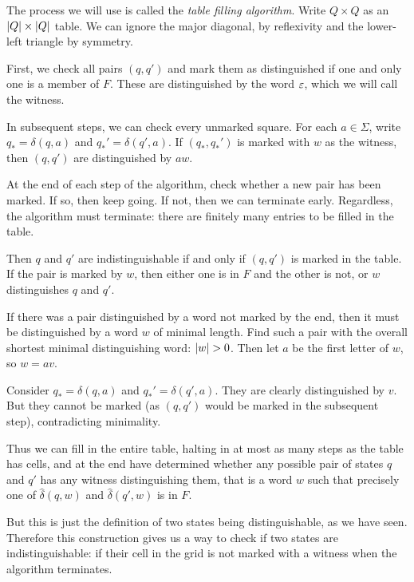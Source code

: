 \documentclass{article}
\begin{document}
\begin{prf}
	The process we will use is called the \textit{table filling algorithm}. Write $Q \times Q$ as an $\left\lvert Q \right\rvert \times \left\lvert Q \right\rvert$ table. We can ignore the major diagonal, by reflexivity and the lower-left triangle by symmetry.
	    
	First, we check all pairs $(q, q')$ and mark them as distinguished if one and only one is a member of $F$. These are distinguished by the word $\varepsilon$, which we will call the witness.
	    
	In subsequent steps, we can check every unmarked square. For each $a \in \Sigma$, write $q_* = \delta(q, a)$ and $q_*' = \delta(q', a)$. If $(q_*, q_*')$ is marked with $w$ as the witness, then $(q, q')$ are distinguished by $aw$.
	    
	At the end of each step of the algorithm, check whether a new pair has been marked. If so, then keep going. If not, then we can terminate early. Regardless, the algorithm must terminate: there are finitely many entries to be filled in the table.
	    
	Then $q$ and $q'$ are indistinguishable if and only if $(q, q')$ is marked in the table. If the pair is marked by $w$, then either one is in $F$ and the other is not, or $w$ distinguishes $q$ and $q'$.
	    
	If there was a pair distinguished by a word not marked by the end, then it must be distinguished by a word $w$ of minimal length. Find such a pair with the overall shortest minimal distinguishing word: $\left\lvert w \right\rvert > 0$. Then let $a$ be the first letter of $w$, so $w = av$.
	    
	Consider $q_* = \delta(q, a)$ and $q_*' = \delta(q', a)$. They are clearly distinguished by $v$. But they cannot be marked (as $(q, q')$ would be marked in the subsequent step), contradicting minimality.
	    
	Thus we can fill in the entire table, halting in at most as many steps as the table has cells, and at the end have determined whether any possible pair of states $q$ and $q'$ has any witness distinguishing them, that is a word $w$ such that precisely one of $\hat \delta(q, w)$ and $\hat \delta(q', w)$ is in $F$.
	    
	But this is just the definition of two states being distinguishable, as we have seen. Therefore this construction gives us a way to check if two states are indistinguishable: if their cell in the grid is not marked with a witness when the algorithm terminates.
\end{prf}
\end{document}
